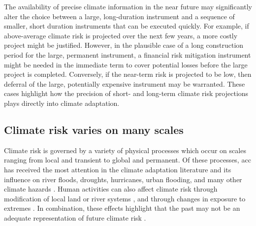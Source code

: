 \documentclass[
  draft,
  linenumbers
]{agujournal2018}
\makeatletter
\newcommand{\eg}{e.g.\@\xspace}
\makeatother
\begin{document}
The availability of precise climate information in the near future may significantly alter the choice between a large, long-duration instrument and a sequence of smaller, short duration instruments that can be executed quickly.
For example, if above-average climate risk is projected over the next few years, a more costly project might be justified.
However, in the plausible case of a long construction period for the large, permanent instrument, a financial risk mitigation instrument might be needed in the immediate term to cover potential losses before the large project is completed.
Conversely, if the near-term risk is projected to be low, then deferral of the large, potentially expensive instrument may be warranted.
These cases highlight how the precision of short- and long-term climate risk projections plays directly into climate adaptation.

\subsection{Climate risk varies on many scales}\label{sec:intro-lfv}

Climate risk is governed by a variety of physical processes which occur on scales ranging from local and transient to global and permanent.
Of these processes, \gls{acc} has received the most attention in the climate adaptation literature and its influence on  river floods, droughts, hurricanes, urban flooding, and many other climate hazards   \citep[\eg,][]{Coumou:2012bc,Milly:2008dg,OGorman:2009hj,Trenberth:2003bj}.
Human activities can also affect climate risk through modification of local land or river systems \citep[see][]{Merz:2014gf}, and through changes in exposure to extremes \citep{baldassarre:2018,Jongman:2012cr}.
In combination, these effects highlight that the past may not be an adequate representation of future climate risk \citep[termed ``nonstationarity'' by][]{Milly:2008dg}.
\end{document}
